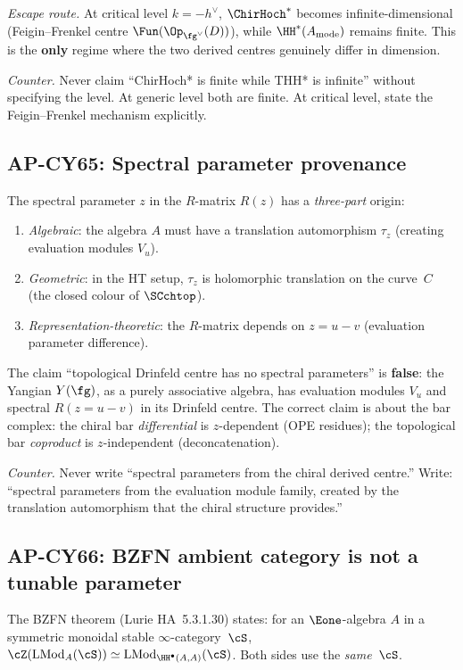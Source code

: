 \emph{Escape route.}  At critical level $k = -h^\vee$,
$\ChirHoch^*$ becomes infinite-dimensional (Feigin--Frenkel centre
$\Fun(\Op_{\fg^\vee}(D))$), while $\HH^*(A_{\mathrm{mode}})$
remains finite.  This is the \textbf{only} regime where the two
derived centres genuinely differ in dimension.

\emph{Counter.}  Never claim ``ChirHoch* is finite while THH* is
infinite'' without specifying the level.  At generic level both are
finite.  At critical level, state the Feigin--Frenkel mechanism
explicitly.

\subsection{AP-CY65: Spectral parameter provenance}

The spectral parameter $z$ in the $R$-matrix $R(z)$ has a
\emph{three-part} origin:
\begin{enumerate}[label=(\alph*),nosep]
\item \emph{Algebraic}: the algebra $A$ must have a translation
      automorphism $\tau_z$ (creating evaluation modules $V_u$).
\item \emph{Geometric}: in the HT setup, $\tau_z$ is holomorphic
      translation on the curve~$C$ (the closed colour of $\SCchtop$).
\item \emph{Representation-theoretic}: the $R$-matrix depends on
      $z = u - v$ (evaluation parameter difference).
\end{enumerate}
The claim ``topological Drinfeld centre has no spectral parameters''
is \textbf{false}: the Yangian $Y(\fg)$, as a purely associative
algebra, has evaluation modules $V_u$ and spectral $R(z{=}u{-}v)$
in its Drinfeld centre.  The correct claim is about the bar complex:
the chiral bar \emph{differential} is $z$-dependent (OPE residues);
the topological bar \emph{coproduct} is $z$-independent
(deconcatenation).

\emph{Counter.}  Never write ``spectral parameters from the chiral
derived centre.''  Write: ``spectral parameters from the evaluation
module family, created by the translation automorphism that the
chiral structure provides.''

\subsection{AP-CY66: BZFN ambient category is not a tunable parameter}

The BZFN theorem (Lurie HA~5.3.1.30) states: for an $\Eone$-algebra
$A$ in a symmetric monoidal stable $\infty$-category~$\cS$,
$\cZ(\mathrm{LMod}_A(\cS)) \simeq
\mathrm{LMod}_{\HH^\bullet(A,A)}(\cS)$.  Both sides use the
\emph{same}~$\cS$.

